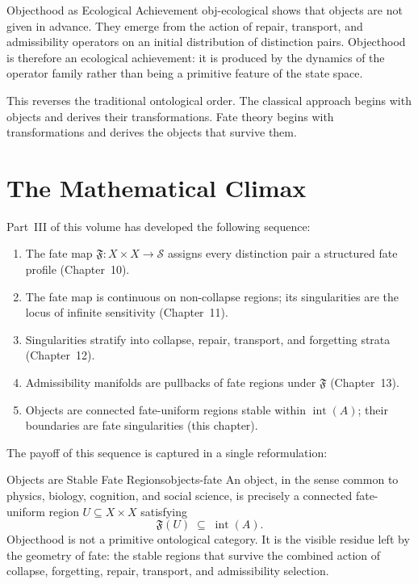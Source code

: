 \documentclass[12pt,twoside,openright]{book}
\newcommand{\distPairs}{X\times X}
\newcommand{\fateMap}{\mathfrak{F}}
\newcommand{\fateSpace}{\mathcal{S}}
\newcommand{\admRegion}{A}
\providecommand{\admRegion}{A}
\begin{document}
\begin{remark}{Objecthood as Ecological Achievement}%
  {obj-ecological}
 shows that objects are not given
in advance. They emerge from the action of repair, transport,
and admissibility operators on an initial distribution of
distinction pairs. Objecthood is therefore an ecological
achievement: it is produced by the dynamics of the operator
family rather than being a primitive feature of the state space.

This reverses the traditional ontological order. The classical
approach begins with objects and derives their transformations.
Fate theory begins with transformations and derives the objects
that survive them.
\end{remark}

\section{The Mathematical Climax}

Part~III of this volume has developed the following sequence:

\begin{enumerate}[nosep,leftmargin=2em]
  \item The fate map $\fateMap:\distPairs\to\fateSpace$ assigns
    every distinction pair a structured fate profile
    (Chapter~10).
  \item The fate map is continuous on non-collapse regions;
    its singularities are the locus of infinite sensitivity
    (Chapter~11).
  \item Singularities stratify into collapse, repair,
    transport, and forgetting strata (Chapter~12).
  \item Admissibility manifolds are pullbacks of fate regions
    under $\fateMap$ (Chapter~13).
  \item Objects are connected fate-uniform regions stable
    within $\operatorname{int}(\admRegion)$; their boundaries
    are fate singularities (this chapter).
\end{enumerate}

The payoff of this sequence is captured in a single
reformulation:

\begin{metatheorem}{Objects are Stable Fate Regions}{objects-fate}
An object, in the sense common to physics, biology, cognition,
and social science, is precisely a connected fate-uniform
region $U\subseteq\distPairs$ satisfying
\[
  \fateMap(U)\;\subseteq\;\operatorname{int}(\admRegion).
\]
Objecthood is not a primitive ontological category. It is the
visible residue left by the geometry of fate: the stable
regions that survive the combined action of collapse,
forgetting, repair, transport, and admissibility selection.
\end{metatheorem}
\end{document}
